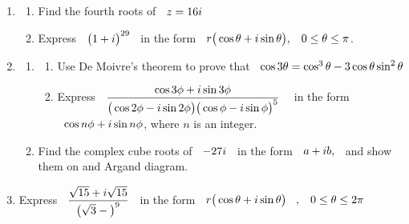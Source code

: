 \documentclass[11pt,a4paper]{article}
\begin{document}
\begin{enumerate}
\item
\begin{enumerate}
      \item Find the fourth roots of $\hspace{0.2cm} z = 16i$
      
      \item Express $\hspace{0.2cm} \big( 1 + i\big)^{29}\hspace{0.2cm}$ in the form $\hspace{0.2cm} r \big(\cos \theta + i \sin \theta \big), \hspace{0.3cm} 0\leq \theta \leq \pi$.\\
\end{enumerate}


\item
\begin{enumerate}
    \item
\begin{enumerate}
          \item  Use De Moivre's theorem to prove that $\hspace{0.2cm} \cos 3 \theta  = \cos^3\theta - 3\cos \theta \sin^2\theta$
          
          \item Express $\hspace{0.2cm}\dfrac{\cos 3\phi + i\sin 3\phi}{\big(\cos 2\phi - i \sin 2\phi\big)\big(\cos \phi - i\sin \phi\big)^5}\hspace{0.3cm}$ in the form $\hspace{0.2cm} \cos n \phi + i \sin n\phi$, where $n$ is an integer.
\end{enumerate}    
    
    \item Find the complex cube roots of $\hspace{0.2cm} -27i\hspace{0.2cm}$ in the form $\hspace{0.2cm} a + ib,\hspace{0.2cm}$ and show them on and Argand diagram.\\
\end{enumerate}




\item Express $\hspace{0.2cm}\dfrac{\sqrt{15} + i\sqrt{15}}{\big(\sqrt{3} - \big)^9}\hspace{0.2cm}$ in the form $\hspace{0.2cm} r\big(\cos \theta + i\sin \theta \big)\hspace{0.3cm}, \hspace{0.3cm} 0\leq \theta \leq 2\pi$\\



\end{enumerate}
\end{document}
